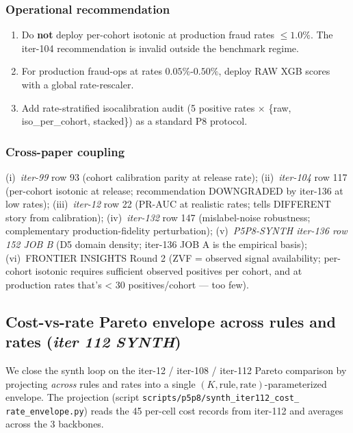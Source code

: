 \documentclass{article}
\begin{document}
\subsubsection{Operational recommendation}

\begin{enumerate}
\item Do \textbf{not} deploy per-cohort isotonic at production fraud rates $\le 1.0\%$. The iter-104 recommendation
      is invalid outside the benchmark regime.
\item For production fraud-ops at rates $0.05\%$-$0.50\%$, deploy RAW XGB scores with a global rate-rescaler.
\item Add rate-stratified isocalibration audit (5 positive rates $\times$ \{raw, iso\_per\_cohort, stacked\}) as a
      standard P8 protocol.
\end{enumerate}

\subsubsection{Cross-paper coupling}

(i)~\textit{iter-99} row 93 (cohort calibration parity at release rate); (ii)~\textit{iter-104} row 117
(per-cohort isotonic at release; recommendation DOWNGRADED by iter-136 at low rates);
(iii)~\textit{iter-12} row 22 (PR-AUC at realistic rates; tells DIFFERENT story from calibration);
(iv)~\textit{iter-132} row 147 (mislabel-noise robustness; complementary production-fidelity perturbation);
(v)~\textit{P5P8-SYNTH iter-136 row 152 JOB B} (D5 domain density; iter-136 JOB A is the empirical basis);
(vi)~FRONTIER INSIGHTS Round 2 (ZVF = observed signal availability; per-cohort isotonic requires sufficient
observed positives per cohort, and at production rates that's < 30 positives/cohort --- too few).
 \subsection{Cost-vs-rate Pareto envelope across rules and rates
  (\textit{iter 112 SYNTH})}
\label{sec:p8-cost-rate-envelope}

We close the synth loop on the iter-12 / iter-108 / iter-112
Pareto comparison by projecting \emph{across} rules and rates into a
single $(K, \mathrm{rule}, \mathrm{rate})$-parameterized envelope.
The projection (script \texttt{scripts/p5p8/synth\_iter112\_cost\_
rate\_envelope.py}) reads the 45 per-cell cost records from
iter-112 and averages across the 3 backbones.
\end{document}

